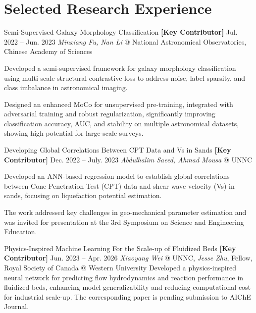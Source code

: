 \section*{Selected Research Experience}
\cvResearchListStart
  \item[\raisebox{0.3ex}{\textbullet}]
  \cvResearchEntry
    {Semi-Supervised Galaxy Morphology Classification}
    {\textbf{[Key Contributor]} Jul. 2022 -- Jun. 2023}
    {\textit{Minxiang Fu, Nan Li} @ National Astronomical Observatories, Chinese Academy of Sciences}
    {
      Developed a semi-supervised framework for galaxy morphology classification using multi-scale structural contrastive loss to address noise, label sparsity, and class imbalance in astronomical imaging. \\
      \item Designed an enhanced MoCo for unsupervised pre-training, integrated with adversarial training and robust regularization, significantly improving classification accuracy, AUC, and stability on multiple astronomical datasets, showing high potential for large-scale surveys.
    }


    \item[\raisebox{0.3ex}{\textbullet}]
    \cvResearchEntry
      {Developing Global Correlations Between CPT Data and Vs in Sands}
      {\textbf{[Key Contributor]} Dec. 2022 -- July. 2023}
      {\textit{Abdulhalim Saeed, Ahmad Mousa} @ UNNC}
      {
        Developed an ANN-based regression model to establish global correlations between Cone Penetration Test (CPT) data and shear wave velocity (Vs) in sands, focusing on liquefaction potential estimation. \\
        \item The work addressed key challenges in geo-mechanical parameter estimation and was invited for presentation at the 3rd Symposium on Science and Engineering Education.
      }
      

    \item[\raisebox{0.3ex}{\textbullet}]
    \cvResearchEntry
      {Physics-Inspired Machine Learning For the Scale-up of Fluidized Beds}
      {\textbf{[Key Contributor]} Jun. 2023 -- Apr. 2026}
      {\textit{Xiaoyang Wei} @ UNNC, \textit{Jesse Zhu}, Fellow, Royal Society of Canada @ Western University}
      {
        Developed a physics-inspired neural network for predicting flow hydrodynamics and reaction performance in fluidized beds, enhancing model generalizability and reducing computational cost for industrial scale-up. The corresponding paper is pending submission to AIChE Journal.
      }


